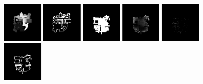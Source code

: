 \paragraph{} 
\begin{figure}[h!] 
	\begin{minipage}[b]{\linewidth}
		
	\begin{center}
		\includegraphics[width=2cm]{figures/results/samples/cond/sample0_map_heightmap_true.png}
		\includegraphics[width=2cm]{figures/results/samples/cond/sample0_map_wallmap_true.png}
		\hfill 
		\includegraphics[width=2cm]{figures/results/samples/cond/sample0_map_floormap_generated.png}
		\includegraphics[width=2cm]{figures/results/samples/cond/sample0_map_heightmap_generated.png}
		\includegraphics[width=2cm]{figures/results/samples/cond/sample0_map_thingsmap_generated.png}
		\includegraphics[width=2cm]{figures/results/samples/cond/sample0_map_wallmap_generated.png}
	\end{center}
	

\end{minipage}
\end{figure}
